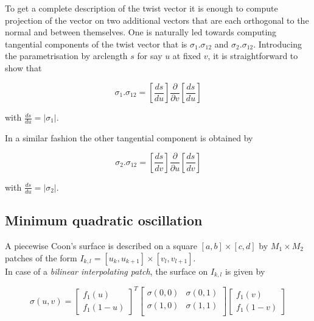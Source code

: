 \documentclass[a4paper, 11pt]{article}
\begin{document}
To get a complete description of the twist vector it is enough to compute projection of the vector on two additional 
vectors that are each orthogonal to the normal and between themselves. One is naturally led towards computing tangential 
components of the twist vector that is $\sigma_1.\sigma_{12}$ and $\sigma_2.\sigma_{12}$. Introducing the 
parametrisation by arclength $s$ for say $u$ at fixed $v$, it is straightforward to show that

\begin{equation}
  \sigma_1.\sigma_{12} = \left[\frac{ds}{du}\right] \frac{\partial}{\partial v} \left[\frac{ds}{du}\right]
\end{equation}

with $\frac{ds}{du} = |\sigma_1|$.

In a similar fashion the other tangential component is obtained by

\begin{equation}
  \sigma_2.\sigma_{12} = \left[\frac{ds}{dv}\right] \frac{\partial}{\partial u} \left[\frac{ds}{dv}\right]
\end{equation}

with $\frac{ds}{du} = |\sigma_2|$.

\subsection{Minimum quadratic oscillation}

A piecewise Coon's surface is described on a square $[a, b]\times[c,d]$ by $M_1 \times M_2$ patches of the form $I_{k,l} 
= [u_{k}, u_{k+1}]\times[v_l, v_{l+1}]$. \\

In case of a \emph{bilinear interpolating patch}, the surface on $I_{k,l}$ is given by

\begin{equation}
  \sigma(u,v) = \begin{bmatrix} f_1(u) \\ f_1(1-u)  \end{bmatrix}^T
  \begin{bmatrix}
    \sigma(0,0) & \sigma(0,1) \\
    \sigma(1,0) & \sigma(1,1) \\
  \end{bmatrix}
  \begin{bmatrix} f_1(v) \\ f_1(1-v) \end{bmatrix}
\end{equation}
\end{document}
